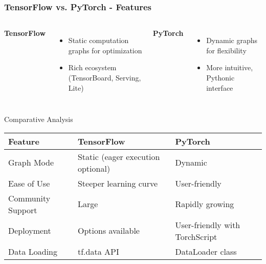 \documentclass[aspectratio=169]{beamer}
\begin{document}
\begin{frame}[fragile]
    \frametitle{TensorFlow vs. PyTorch - Features}
    \begin{columns}
            \textbf{TensorFlow}
            \begin{itemize}
                \item Static computation graphs for optimization
                \item Rich ecosystem (TensorBoard, Serving, Lite)
            \end{itemize}
            \textbf{PyTorch}
            \begin{itemize}
                \item Dynamic graphs for flexibility
                \item More intuitive, Pythonic interface
            \end{itemize}
    \end{columns}
    
    \begin{block}{Comparative Analysis}
        \begin{tabular}{|l|l|l|}
            \hline
            Feature & TensorFlow & PyTorch \\
            \hline
            Graph Mode & Static (eager execution optional) & Dynamic \\
            Ease of Use & Steeper learning curve & User-friendly \\
            Community Support & Large & Rapidly growing \\
            Deployment & Options available & User-friendly with TorchScript \\
            Data Loading & tf.data API & DataLoader class \\
            \hline
        \end{tabular}
    \end{block}
\end{frame}
\end{document}
